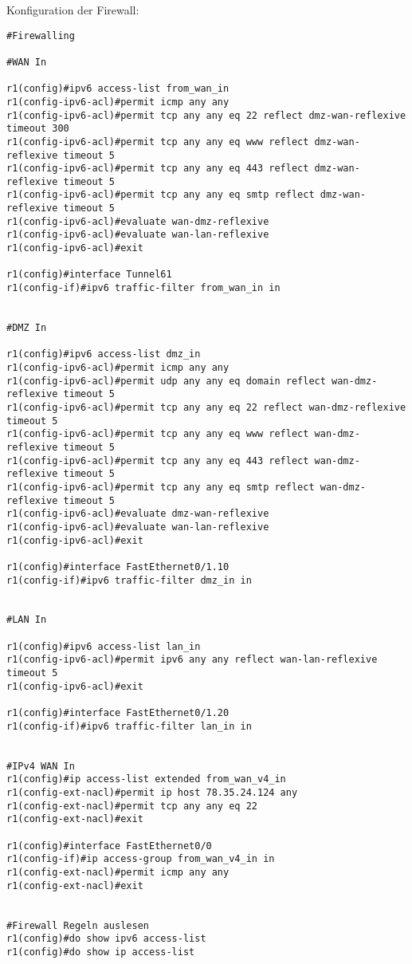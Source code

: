 Konfiguration der Firewall:
\begin{lstlisting}[numbers=none]
#Firewalling

#WAN In

r1(config)#ipv6 access-list from_wan_in
r1(config-ipv6-acl)#permit icmp any any
r1(config-ipv6-acl)#permit tcp any any eq 22 reflect dmz-wan-reflexive timeout 300
r1(config-ipv6-acl)#permit tcp any any eq www reflect dmz-wan-reflexive timeout 5
r1(config-ipv6-acl)#permit tcp any any eq 443 reflect dmz-wan-reflexive timeout 5
r1(config-ipv6-acl)#permit tcp any any eq smtp reflect dmz-wan-reflexive timeout 5
r1(config-ipv6-acl)#evaluate wan-dmz-reflexive
r1(config-ipv6-acl)#evaluate wan-lan-reflexive
r1(config-ipv6-acl)#exit

r1(config)#interface Tunnel61
r1(config-if)#ipv6 traffic-filter from_wan_in in


#DMZ In

r1(config)#ipv6 access-list dmz_in
r1(config-ipv6-acl)#permit icmp any any
r1(config-ipv6-acl)#permit udp any any eq domain reflect wan-dmz-reflexive timeout 5
r1(config-ipv6-acl)#permit tcp any any eq 22 reflect wan-dmz-reflexive timeout 5
r1(config-ipv6-acl)#permit tcp any any eq www reflect wan-dmz-reflexive timeout 5
r1(config-ipv6-acl)#permit tcp any any eq 443 reflect wan-dmz-reflexive timeout 5
r1(config-ipv6-acl)#permit tcp any any eq smtp reflect wan-dmz-reflexive timeout 5
r1(config-ipv6-acl)#evaluate dmz-wan-reflexive
r1(config-ipv6-acl)#evaluate wan-lan-reflexive
r1(config-ipv6-acl)#exit

r1(config)#interface FastEthernet0/1.10
r1(config-if)#ipv6 traffic-filter dmz_in in


#LAN In

r1(config)#ipv6 access-list lan_in
r1(config-ipv6-acl)#permit ipv6 any any reflect wan-lan-reflexive timeout 5
r1(config-ipv6-acl)#exit

r1(config)#interface FastEthernet0/1.20
r1(config-if)#ipv6 traffic-filter lan_in in


#IPv4 WAN In
r1(config)#ip access-list extended from_wan_v4_in
r1(config-ext-nacl)#permit ip host 78.35.24.124 any
r1(config-ext-nacl)#permit tcp any any eq 22
r1(config-ext-nacl)#exit

r1(config)#interface FastEthernet0/0
r1(config-if)#ip access-group from_wan_v4_in in
r1(config-ext-nacl)#permit icmp any any
r1(config-ext-nacl)#exit


#Firewall Regeln auslesen
r1(config)#do show ipv6 access-list
r1(config)#do show ip access-list
\end{lstlisting}
